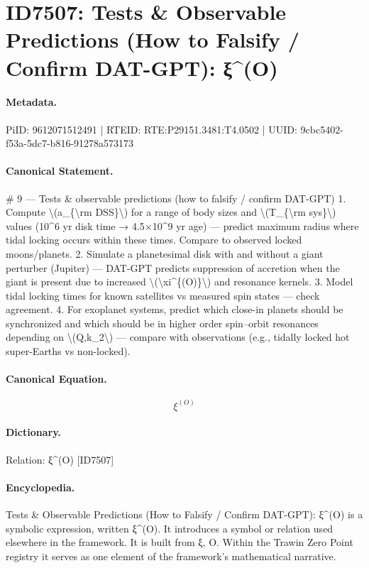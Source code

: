 \section*{ID7507: Tests \& Observable Predictions (How to Falsify / Confirm DAT-GPT): ξ\textasciicircum{}(O)}
\paragraph{Metadata.}
PiID: 9612071512491 | RTEID: RTE:P29151.3481:T4.0502 | UUID: 9cbc5402-f53a-5dc7-b816-91278a573173

\paragraph{Canonical Statement.}
\# 9 — Tests \& observable predictions (how to falsify / confirm DAT-GPT) 1. Compute \textbackslash{}(a\_\{\textbackslash{}rm DSS\}\textbackslash{}) for a range of body sizes and \textbackslash{}(T\_\{\textbackslash{}rm sys\}\textbackslash{}) values (10\textasciicircum{}6 yr disk time → 4.5×10\textasciicircum{}9 yr age) — predict maximum radius where tidal locking occurs within these times. Compare to observed locked moons/planets. 2. Simulate a planetesimal disk with and without a giant perturber (Jupiter) — DAT-GPT predicts suppression of accretion when the giant is present due to increased \textbackslash{}(\textbackslash{}xi\textasciicircum{}\{(O)\}\textbackslash{}) and resonance kernels. 3. Model tidal locking times for known satellites vs measured spin states — check agreement. 4. For exoplanet systems, predict which close-in planets should be synchronized and which should be in higher order spin–orbit resonances depending on \textbackslash{}(Q,k\_2\textbackslash{}) — compare with observations (e.g., tidally locked hot super-Earths vs non-locked).

\paragraph{Canonical Equation.}
\[
\xi^{(O)}
\]

\paragraph{Dictionary.}
Relation: ξ\textasciicircum{}(O) [ID7507]

\paragraph{Encyclopedia.}
Tests \& Observable Predictions (How to Falsify / Confirm DAT-GPT): ξ\textasciicircum{}(O) is a symbolic expression, written ξ\textasciicircum{}(O). It introduces a symbol or relation used elsewhere in the framework. It is built from ξ, O. Within the Trawin Zero Point registry it serves as one element of the framework's mathematical narrative.
